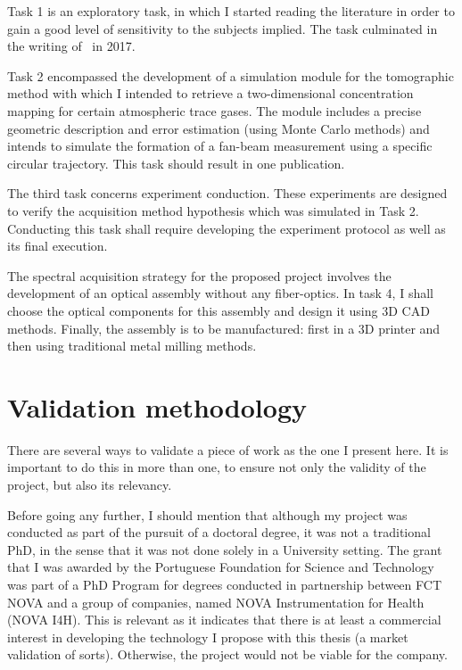 Task 1 is an exploratory task, in which I started reading the literature
in order to gain a good level of sensitivity to the subjects implied.
The task culminated in the writing of~\cite{ValentedeAlmeida2017} in
2017.

Task 2 encompassed the development of a simulation module for the
tomographic method with which I intended to retrieve a two-dimensional
concentration mapping for certain atmospheric trace gases. The module
includes a precise geometric description and error estimation (using
Monte Carlo methods) and intends to simulate the formation of a fan-beam
measurement using a specific circular trajectory. This task should
result in one publication.

The third task concerns experiment conduction. These experiments are
designed to verify the acquisition method hypothesis which was simulated
in Task 2. Conducting this task shall require developing the experiment
protocol as well as its final execution.

The spectral acquisition strategy for the proposed project involves the
development of an optical assembly without any fiber-optics. In task 4,
I shall choose the optical components for this assembly and design it
using 3D CAD methods. Finally, the assembly is to be manufactured: first
in a 3D printer and then using traditional metal milling methods.


\section{Validation methodology}%
\label{sec:validation_methodology}

There are several ways to validate a piece of work as the one I present
here. It is important to do this in more than one, to ensure not only
the validity of the project, but also its relevancy.

Before going any further, I should mention that although my project was
conducted as part of the pursuit of a doctoral degree, it was not a
traditional PhD, in the sense that it was not done solely in a
University setting. The grant that I was awarded by the Portuguese
Foundation for Science and Technology was part of a PhD Program for
degrees conducted in partnership between FCT NOVA and a group of
companies, named NOVA Instrumentation for Health (NOVA I4H). This is
relevant as it indicates that there is at least a commercial interest in
developing the technology I propose with this thesis (a market
validation of sorts). Otherwise, the project would not be viable for the
company.

